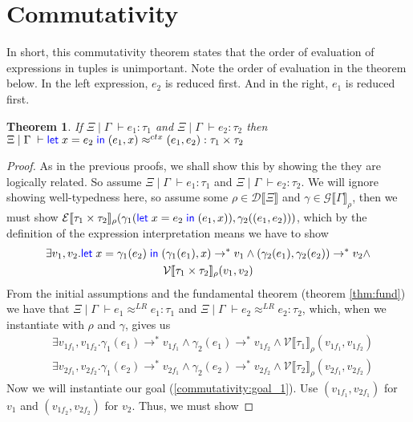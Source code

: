 \documentclass[twoside,11pt,openright]{report}
\newtheorem{theorem}{Theorem}
\theoremstyle{definition}
\newcommand{\var}{x}
\newcommand{\expr}{e}
\newcommand{\val}{v}
\newcommand{\Tprod}[2]{#1 \times #2}
\newcommand{\typ}{\tau}
\newcommand{\venv}{\Gamma}
\newcommand{\tenv}{\Xi}
\newcommand{\jdg}[4]{#1 \; | \; #2 \; \vdash #3 : #4}
\newcommand{\jdgRel}[6]{#1 \; | \; #2 \; \vdash #3 \approx^{#4} #5 : #6}
\newcommand{\ctxRel}[5]{\jdgRel{#1}{#2}{#3}{ctx}{#4}{#5}}
\newcommand{\stepS}{\rightarrow^*}
\newcommand{\ValInp}[2]{\mathcal{V} \llbracket #1 \rrbracket_{#2}}
\newcommand{\ValInpGen}[2]{\ValInp{#1}{#2}(\val_1, \val_2)}
\newcommand{\ExpInp}[2]{\mathcal{E} \llbracket #1 \rrbracket_{#2}}
\newcommand{\VenvInp}[2]{\mathcal{G} \llbracket #1 \rrbracket_{#2}}
\newcommand{\TenvInp}[1]{\mathcal{D} \llbracket #1 \rrbracket}
\newcommand{\LogRel}[5]{\jdgRel{#1}{#2}{#3}{LR}{#4}{#5}}
\begin{document}
\section{Commutativity}
In short, this commutativity theorem states that the order of evaluation of expressions in tuples is unimportant. Note the order of evaluation in the theorem below. In the left expression, $\expr_2$ is reduced first. And in the right, $\expr_1$ is reduced first.
\begin{theorem}
  If $\jdg{\tenv}{\venv}{\expr_1}{\typ_1}$ and $\jdg{\tenv}{\venv}{\expr_2}{\typ_2}$ then\\
  $\ctxRel{\tenv}{\venv}{\Let \var = \expr_2 in (\expr_1, \var)}{(\expr_1, \expr_2)}{\Tprod{\typ_1}{\typ_2}}$
\end{theorem}
\begin{proof}
  As in the previous proofs, we shall show this by showing the they are logically related. So assume $\jdg{\tenv}{\venv}{\expr_1}{\typ_1}$ and $\jdg{\tenv}{\venv}{\expr_2}{\typ_2}$. We will ignore showing well-typedness here, so assume some $\rho \in \TenvInp{\tenv}$ and $\gamma \in \VenvInp{\venv}{\rho}$, then we must show $\ExpInp{\Tprod{\typ_1}{\typ_2}}{\rho}(\gamma_1(\Let \var = \expr_2 in (\expr_1, \var)), \gamma_2((\expr_1, \expr_2)))$, which by the definition of the expression interpretation means we have to show
  \begin{multline}\label{commutativity:goal_1}
    \exists \val_1, \val_2 . \Let \var = \gamma_1(\expr_2) in (\gamma_1(\expr_1), \var) \stepS \val_1 \land (\gamma_2(\expr_1), \gamma_2(\expr_2)) \stepS \val_2 \land\\ \ValInpGen{\Tprod{\typ_1}{\typ_2}}{\rho}
  \end{multline}
  From the initial assumptions and the fundamental theorem (theorem \ref{thm:fund}) we have that $\LogRel{\tenv}{\venv}{\expr_1}{\expr_1}{\typ_1}$ and $\LogRel{\tenv}{\venv}{\expr_2}{\expr_2}{\typ_2}$, which, when we instantiate with $\rho$ and $\gamma$, gives us
  \begin{align}
    &\exists \val_{1f_1}, \val_{1f_2} . \gamma_1(\expr_1) \stepS \val_{1f_1} \land \gamma_2(\expr_1) \stepS \val_{1f_2} \land \ValInp{\typ_1}{\rho}(\val_{1f_1}, \val_{1f_2})\label{commutativity:1.1}\\
    &\exists \val_{2f_1}, \val_{2f_2} . \gamma_1(\expr_2) \stepS \val_{2f_1} \land \gamma_2(\expr_2) \stepS \val_{2f_2} \land \ValInp{\typ_2}{\rho}(\val_{2f_1}, \val_{2f_2})\label{commutativity:1.2}
  \end{align}
  Now we will instantiate our goal (\ref*{commutativity:goal_1}). Use $(\val_{1f_1}, \val_{2f_1})$ for $\val_1$ and $(\val_{1f_2}, \val_{2f_2})$ for $\val_2$. Thus, we must show 

\end{proof}
\end{document}
